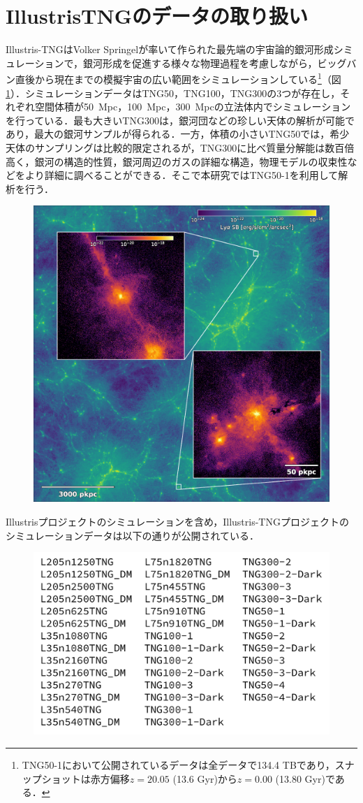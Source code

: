 \section{IllustrisTNGのデータの取り扱い}

Illustris-TNGはVolker Springelが率いて作られた最先端の宇宙論的銀河形成シミュレーションで，銀河形成を促進する様々な物理過程を考慮しながら，ビッグバン直後から現在までの模擬宇宙の広い範囲をシミュレーションしている\footnote{TNG50-1において公開されているデータは全データで134.4 TBであり，スナップショットは赤方偏移$z=20.05$ (13.6 Gyr)から$z=0.00$ (13.80 Gyr)である．}（図\ref{fig:TNG50_z3_LymanAlpha_emission_2k}）．シミュレーションデータはTNG50，TNG100，TNG300の3つが存在し，それぞれ空間体積が\SI{50}{Mpc}，\SI{100}{Mpc}，\SI{300}{Mpc}の立法体内でシミュレーションを行っている．最も大きいTNG300は，銀河団などの珍しい天体の解析が可能であり，最大の銀河サンプルが得られる．一方，体積の小さいTNG50では，希少天体のサンプリングは比較的限定されるが，TNG300に比べ質量分解能は数百倍高く，銀河の構造的性質，銀河周辺のガスの詳細な構造，物理モデルの収束性などをより詳細に調べることができる．そこで本研究ではTNG50-1を利用して解析を行う．

\begin{figure}
	\centering
	\includegraphics[width=0.7\linewidth]{./pic/TNG50_z3_LymanAlpha_emission_2k.png}
	\caption{}
	\label{fig:TNG50_z3_LymanAlpha_emission_2k}
\end{figure}

Illustrisプロジェクトのシミュレーションを含め，Illustris-TNGプロジェクトのシミュレーションデータは以下の通りが公開されている．

\begin{figure}[H]
	\centering
	\includegraphics[width=0.5\linewidth]{./pic/ALLsimTNG.pdf}
\end{figure}


